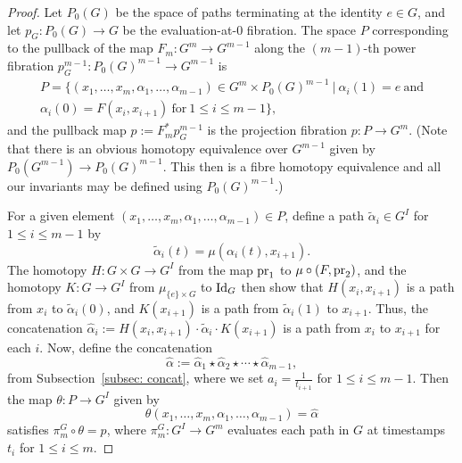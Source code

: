 \documentclass[amscd,amssymb,verbatim,10pt]{amsart}
\numberwithin{equation}{section}
\theoremstyle{plain}
\theoremstyle{definition}
\def\id{\protect\operatorname{Id}}
\def\pr{\protect\operatorname{pr}}
\def\wt{\widetilde}
\def\wh{\widehat}
\begin{document}
\begin{proof}
Let $P_0(G)$ be the space of paths terminating at the identity $e\in G$, and let $p_G\colon P_0(G)\to G$ be the evaluation-at-$0$ fibration. The space $P$ corresponding to the pullback of the map $F_m\colon G^m\to G^{m-1}$ along the $(m-1)$-th power fibration $p_G^{m-1}\colon P_0(G)^{m-1}\to G^{m-1}$ is
\begin{multline*}
P=\bigl\{\left(x_1,\dots,x_m,\alpha_1,\dots,\alpha_{m-1}\right)\in G^m\times P_0(G)^{m-1}\ \big|\ \alpha_i(1)=e \ \text{and}
\\
\alpha_i(0)=F(x_i,x_{i+1}) \ \text{for}\ 1\le i \le m-1 \bigr\},
\end{multline*}
and the pullback map $p:=F^*_mp^{m-1}_G$ is the projection fibration $p\colon P\to G^m$. 
(Note that there is an obvious homotopy equivalence over $G^{m-1}$ given by $P_0(G^{m-1}) \to 
P_0(G)^{m-1}$. This then is a fibre homotopy equivalence and all our invariants may be
defined using $P_0(G)^{m-1}$.)

For a given element $(x_1,\dots,x_m,\alpha_1,\dots,\alpha_{m-1})\in P$, define a path $\wt\alpha_i\in G^I$ for $1\le i \le m-1$ by 
\[
\wt\alpha_i(t)=\mu(\alpha_i(t),x_{i+1}).
\]
The homotopy $H\colon G\times G\to G^I$ from the map $\pr_1$ to $\mu\circ (F,\pr_2)$, and the 
homotopy $K\colon G\to G^I$ from $\mu_{\{e\}\times G}$ to $\id_G$ then show that 
$H(x_i,x_{i+1})$ is a path from $x_i$ to $\wt\alpha_i(0)$, and $K(x_{i+1})$ is a path 
from $\wt\alpha_i(1)$ to $x_{i+1}$. Thus, the concatenation $\wh\alpha_i:=H(x_i,x_{i+1})\cdot \wt\alpha_i\cdot K(x_{i+1})$ is a path from $x_i$ to $x_{i+1}$ for each $i$. Now, define the concatenation
\[
\wh\alpha:=\wh\alpha_1\star\wh\alpha_2\star\cdots\star\wh\alpha_{m-1},
\]
from Subsection~\ref{subsec: concat}, where we set $a_i=\tfrac{1}{t_{i+1}}$ for 
$1\le i\le m-1$. Then the map $\theta\colon P\to G^I$ given by
\[
\theta\left(x_1,\dots,x_m,\alpha_1,\dots,\alpha_{m-1}\right)=\wh\alpha
\]
satisfies $\pi^G_m\circ\theta= p$, where $\pi^G_m\colon G^I\to G^m$ evaluates each path in $G$ at timestamps $t_i$ for $1\le i\le m$. 


\end{proof}
\end{document}
